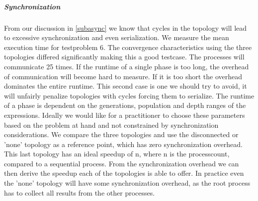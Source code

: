 \subparagraph{Synchronization}
From our discussion in \ref{subasync} we know that cycles in the topology will lead to excessive synchronization and even serialization.
We measure the mean execution time for testproblem 6. The convergence characteristics using the three topologies differed significantly making this a good testcase. The processes will communicate 25 times. If the runtime of a single phase is too long, the overhead of communication will become hard to measure. If it is too short the overhead dominates the entire runtime. This second case is one we should try to avoid, it will unfairly penalize topologies with cycles forcing them to serialize. The runtime of a phase is dependent on the generations, population and depth ranges of the expressions. Ideally we would like for a practitioner to choose these parameters based on the problem at hand and not constrained by synchronization considerations.
We compare the three topologies and use the disconnected or 'none' topology as a reference point, which has zero synchronization overhead.
This last topology has an ideal speedup of n, where n is the processcount, compared to a sequential process. From the synchronization overhead we can then derive the speedup each of the topologies is able to offer. In practice even the 'none' topology will have some synchronization overhead, as the root process has to collect all results from the other processes.
